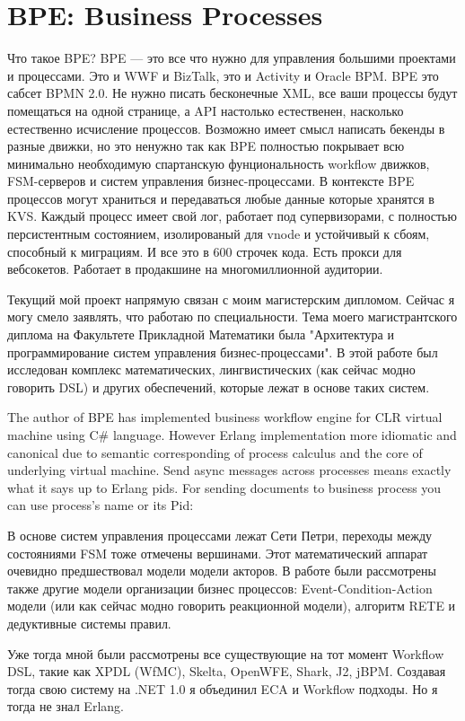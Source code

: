 \section{BPE: Business Processes}

Что такое BPE? BPE — это все что нужно для управления большими
проектами и процессами. Это и WWF и BizTalk, это и Activity и Oracle BPM.
BPE это сабсет BPMN 2.0. Не нужно писать бесконечные XML, все ваши
процессы будут помещаться на одной странице, а API настолько
естественен, насколько естественно исчисление процессов. Возможно
имеет смысл написать бекенды в разные движки, но это ненужно так
как BPE полностью покрывает всю минимально необходимую спартанскую
фунциональность workflow движков, FSM-серверов и систем управления
бизнес-процессами. В контексте BPE процессов могут храниться и
передаваться любые данные которые хранятся в KVS. Каждый процесс
имеет свой лог, работает под супервизорами, с полностью персистентным
состоянием, изолированый для vnode и устойчивый к сбоям, способный к
миграциям. И все это в 600 строчек кода. Есть прокси для вебсокетов.
Работает в продакшине на многомиллионной аудитории.

Текущий мой проект напрямую связан с моим магистерским дипломом.
Сейчас я могу смело заявлять, что работаю по специальности.
Тема моего магистрантского диплома на Факультете Прикладной
Математики была "Архитектура и программирование систем
управления бизнес-процессами". В этой работе был исследован
комплекс математических, лингвистических (как сейчас модно
говорить DSL) и других обеспечений, которые лежат в основе таких систем.

The author of BPE has implemented business workflow engine for CLR virtual
machine using C\# language. However Erlang implementation more idiomatic
and canonical due to semantic corresponding of process calculus and
the core of underlying virtual machine. Send async messages across processes
means exactly what it says up to Erlang pids. For sending documents to
business process you can use process's name or its Pid:

В основе систем управления процессами лежат Сети Петри,
переходы между состояниями FSM тоже отмечены вершинами.
Этот математический аппарат очевидно предшествовал модели
модели акторов. В работе были рассмотрены также другие
модели организации бизнес процессов: Event-Condition-Action
модели (или как сейчас модно говорить реакционной модели),
алгоритм RETE и дедуктивные системы правил.

Уже тогда мной были рассмотрены все существующие на тот
момент Workflow DSL, такие как XPDL (WfMC), Skelta, OpenWFE,
Shark, J2, jBPM. Создавая тогда свою систему на .NET 1.0 я
объединил ECA и Workflow подходы. Но я тогда не знал Erlang.

